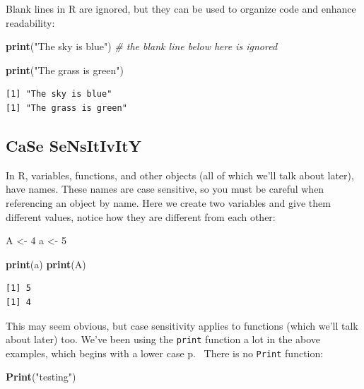 \documentclass[
]{book}
\newenvironment{Shaded}{\begin{snugshade}}{\end{snugshade}}
\newcommand{\CommentTok}[1]{\textcolor[rgb]{0.56,0.35,0.01}{\textit{#1}}}
\newcommand{\DecValTok}[1]{\textcolor[rgb]{0.00,0.00,0.81}{#1}}
\newcommand{\KeywordTok}[1]{\textcolor[rgb]{0.13,0.29,0.53}{\textbf{#1}}}
\newcommand{\NormalTok}[1]{#1}
\newcommand{\StringTok}[1]{\textcolor[rgb]{0.31,0.60,0.02}{#1}}
\begin{document}
Blank lines in R are ignored, but they can be used to organize code and enhance readability:

\begin{Shaded}
\begin{Highlighting}[]
\KeywordTok{print}\NormalTok{(}\StringTok{"The sky is blue"}\NormalTok{)}
\CommentTok{# the blank line below here is ignored}

\KeywordTok{print}\NormalTok{(}\StringTok{"The grass is green"}\NormalTok{)}
\end{Highlighting}
\end{Shaded}

\begin{verbatim}
[1] "The sky is blue"
[1] "The grass is green"
\end{verbatim}

\hypertarget{case-sensitivity}{%
\subsection{CaSe SeNsItIvItY}\label{case-sensitivity}}

In R, variables, functions, and other objects (all of which we'll talk about later), have names.
These names are case sensitive, so you must be careful when referencing an object by name.
Here we create two variables and give them different values, notice how they are different from each other:

\begin{Shaded}
\begin{Highlighting}[]
\NormalTok{A <-}\StringTok{ }\DecValTok{4}
\NormalTok{a <-}\StringTok{ }\DecValTok{5}

\KeywordTok{print}\NormalTok{(a)}
\KeywordTok{print}\NormalTok{(A)}
\end{Highlighting}
\end{Shaded}

\begin{verbatim}
[1] 5
[1] 4
\end{verbatim}

This may seem obvious, but case sensitivity applies to functions (which we'll talk about later) too.
We've been using the \texttt{print} function a lot in the above examples, which begins with a lower case p.~
There is no \texttt{Print} function:

\begin{Shaded}
\begin{Highlighting}[]
\KeywordTok{Print}\NormalTok{(}\StringTok{"testing"}\NormalTok{)}
\end{Highlighting}
\end{Shaded}
\end{document}
